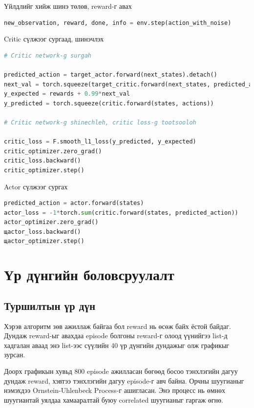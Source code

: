 \documentclass[12pt,A4]{report}
\begin{document}
Үйлдлийг хийж шинэ төлөв, reward-г авах

\begin{lstlisting}[language=Python, caption=Үйлдэл хийх, frame=single]
new_observation, reward, done, info = env.step(action_with_noise)
\end{lstlisting}

Critic сүлжээг сургаад, шинэчлэх

\begin{lstlisting}[language=Python, caption=Critic сүлжээг сургах шинэчлэх, frame=single]
# Critic network-g surgah

predicted_action = target_actor.forward(next_states).detach()
next_val = torch.squeeze(target_critic.forward(next_states, predicted_action).detach())
y_expected = rewards + 0.99*next_val
y_predicted = torch.squeeze(critic.forward(states, actions))

# Critic network-g shinechleh, critic loss-g tootsooloh
            
critic_loss = F.smooth_l1_loss(y_predicted, y_expected)
critic_optimizer.zero_grad()
critic_loss.backward()
critic_optimizer.step()
\end{lstlisting}	

Actor сүлжээг сургах

\begin{lstlisting}[language=Python, caption=Actor сүлжээг сургах, frame=single]
predicted_action = actor.forward(states)
actor_loss = -1*torch.sum(critic.forward(states, predicted_action))
actor_optimizer.zero_grad()
щactor_loss.backward()
щactor_optimizer.step()
\end{lstlisting}

\chapter{Үр дүнгийн боловсруулалт}

\section{Туршилтын үр дүн}

Хэрэв алгоритм зөв ажиллаж байгаа бол reward нь өсөж байх ёстой байдаг. Дундаж reward-ыг авахдаа episode болгоны reward-г олоод үүнийгээ list-д хадгалан аваад энэ list-ээс сүүлийн 40 үр дүнгийн дундажыг олж графикыг зурсан.

Доорх графикын хувьд 800 episode ажилласан бөгөөд босоо тэнхлэгийн дагуу дундаж reward, хэвтээ тэнхлэгийн дагуу episode-г авч байна. Орчны шуугианыг нэмэхдээ Ornstein-Uhlenbeck Process-г ашигласан. Энэ процесс нь өмнөх шуугиантай уялдаа хамааралтай буюу correlated шуугианыг гаргаж өгнө. 
\end{document}

